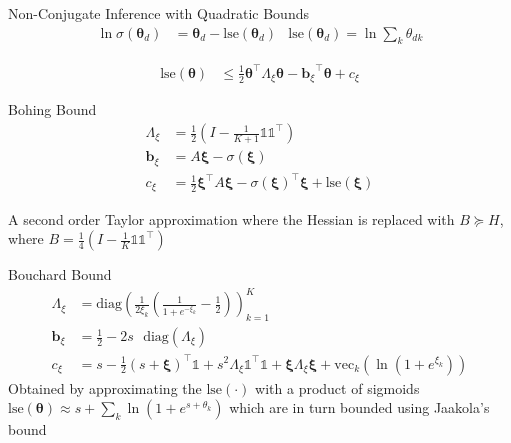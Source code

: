 \documentclass[xcolor=dvipsnames]{beamer}
\newcommand \halve[1] {
	\frac{#1}{2}
}
\newcommand \half {
    \halve{1}
}
\newcommand \T { ^\top }
\newcommand \vv[1] { \boldsymbol #1 }
\newcommand \diag[1] { \text{diag} \left( {#1} \right) }
\newcommand \Axi { { \Lambda_{\xi} } }
\newcommand \bxi { { \vv{b}_{\xi} } }
\newcommand \cxi { { c_{\xi} } }
\newcommand \thd[0]  { { \vv \theta_d } }
\newcommand \one  {{  \mathds{1} }}
\newcommand \lse { \text{lse} }
\begin{document}
\begin{frame}{Non-Conjugate Inference with Quadratic Bounds}
 {
    \begin{align*}
    \ln \sigma(\thd) & = \thd - \lse(\thd) & \lse(\thd) = \ln \sum_k \theta_{dk}
    \end{align*}
}

 {
    \begin{align*}
    \lse(\vv{\theta}) & \leq \half \vv{\theta}\T \Axi \vv{\theta} - \bxi\T\vv{\theta} + \cxi
    \end{align*}
}

 {
    Bohing Bound\cite{Bohning1988a}
    \begin{align*}
    \Axi & = \half \left( I - \frac{1}{K+1}\one \one\T \right) \\
    \bxi & = A \vv{\xi} - \sigma(\vv{\xi})\\
    \cxi & = \half \vv{\xi}\T A \vv{\xi} - \sigma(\vv{\xi})\T\vv{\xi} + \lse(\vv{\xi})
    \end{align*}
    
    A second order Taylor approximation where the Hessian is replaced with $B \succeq H$, where $B = \frac{1}{4}\left( I - \frac{1}{K}\one \one\T \right)$
}

 {
    Bouchard Bound\cite{Bouchard2007}
    \begin{align*}
    \Axi & = \diag{\frac{1}{2\xi_k} \left( \frac{1}{1 + e^{-\xi_k}} - \half\right) }_{k=1}^K  \\
    \bxi & = \half - 2 s \text{ }\diag{\Axi} \\
    \cxi & = s - \half (s + \vv{\xi})\T\one + s^2\Axi \one\T\one + \vv{\xi}\Axi\vv{\xi} + \text{vec}_k(\ln (1 + e^{\xi_k}))
    \end{align*}
Obtained by approximating the $\lse(\cdot)$ with a product of sigmoids $\lse(\vv{\theta}) \approx s + \sum_k \ln (1 + e^{s + \theta_k})$ which are in turn bounded using Jaakola's bound\cite{Jaakkola1997}
}

\end{frame}



\end{document}

